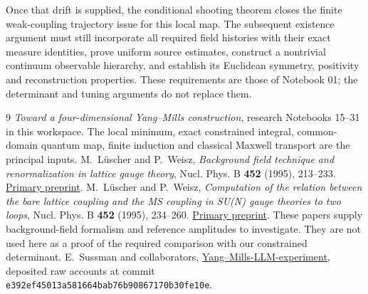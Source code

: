 Once that drift is supplied, the conditional shooting theorem
closes the finite weak-coupling trajectory issue for this local
map. The subsequent existence argument must still incorporate
all required field histories with their exact measure identities,
prove uniform source estimates, construct a nontrivial continuum
observable hierarchy, and establish its Euclidean symmetry,
positivity and reconstruction properties. These requirements are
those of Notebook 01; the determinant and tuning arguments do not
replace them.

\begin{thebibliography}{9}
\emph{Toward a four-dimensional Yang--Mills construction},
research Notebooks 15--31 in this workspace.
The local minimum, exact constrained integral, common-domain
quantum map, finite induction and classical Maxwell transport
are the principal inputs.
M.~L\"uscher and P.~Weisz,
\emph{Background field technique and renormalization in lattice
gauge theory}, Nucl. Phys. B \textbf{452} (1995), 213--233.
\href{https://arxiv.org/abs/hep-lat/9504006}{Primary preprint}.
M.~L\"uscher and P.~Weisz,
\emph{Computation of the relation between the bare lattice
coupling and the MS coupling in SU(N) gauge theories to two
loops}, Nucl. Phys. B \textbf{452} (1995), 234--260.
\href{https://arxiv.org/abs/hep-lat/9505011}{Primary preprint}.
These papers supply background-field formalism and reference
amplitudes to investigate. They are not used here as a proof of
the required comparison with our constrained determinant.
E.~Sussman and collaborators,
\href{https://github.com/ethanwsussman/Yang--Mills-LLM-experiment}
{Yang--Mills-LLM-experiment}, deposited raw accounts at commit
\texttt{e392ef45013a581664bab76b90867170b30fe10e}.
\end{thebibliography}

